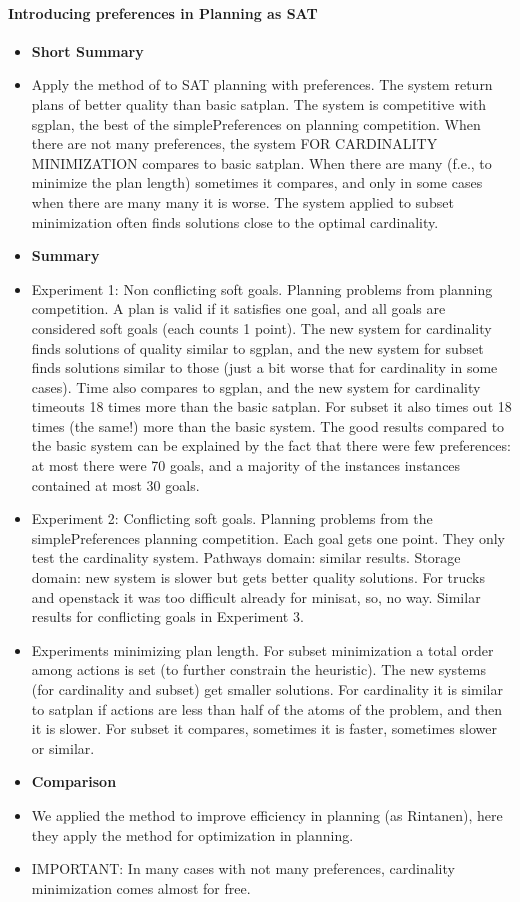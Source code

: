 \paragraph{Introducing preferences in Planning as SAT \cite{giumar11a}}
\begin{itemize}
	\item \textbf{Short Summary}
	\item Apply the method of \cite{rogima10a} to SAT planning with preferences. 
				The system return plans of better quality than basic satplan. 
				The system is competitive with sgplan, the 
				best of the simplePreferences on planning competition. When there are not many preferences, 
				the system FOR CARDINALITY MINIMIZATION compares to basic satplan. 
				When there are many (f.e., to minimize the plan length) sometimes it compares, 
				and only in some cases when there are many many it is worse.
				The system applied to subset minimization often finds solutions close to the optimal cardinality.
	\item \textbf{Summary}
	\item Experiment 1: Non conflicting soft goals. Planning problems from planning competition. 
				A plan is valid if it satisfies one goal, and all goals are considered soft goals (each counts 1 point).
				The new system for cardinality finds solutions of quality similar to sgplan, 
				and the new system for subset finds solutions similar to those (just a bit worse that for cardinality in some cases).
				Time also compares to sgplan, and the new system for cardinality timeouts 18 times more than the basic satplan.
				For subset it also times out 18 times (the same!) more than the basic system.
				The good results compared to the basic system can be explained by the fact that there were few preferences:
				at most there were 70 goals, and a majority of the instances instances contained at most 30 goals.
	\item Experiment 2: Conflicting soft goals. Planning problems from the simplePreferences planning competition.
				Each goal gets one point. They only test the cardinality system. Pathways domain: similar results. 
				Storage domain: new system is slower but gets better quality solutions. For trucks and openstack 
				it was too difficult already for minisat, so, no way. Similar results for conflicting goals in Experiment 3.			
	\item Experiments minimizing plan length. For subset minimization a total order among actions is set (to further constrain the heuristic).
				The new systems (for cardinality and subset) get smaller solutions. 
				For cardinality it is similar to satplan if actions are less than half of the atoms of the problem, and then it is slower.
				For subset it compares, sometimes it is faster, sometimes slower or similar.
	\item \textbf{Comparison}
	\item We applied the method to improve efficiency in planning (as Rintanen), 
				here they apply the method for optimization in planning.
	\item IMPORTANT: In many cases with not many preferences, cardinality minimization comes almost for free.
\end{itemize}


